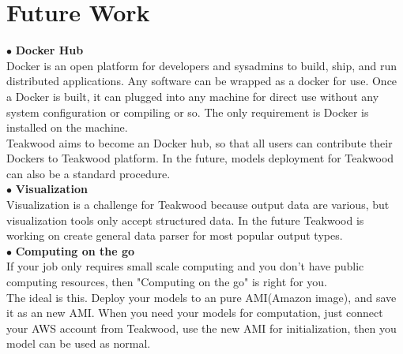 \chapter{Future Work}

$\bullet$ \textbf{Docker Hub}\\

Docker is an open platform for developers and sysadmins to build, ship, and run distributed applications. Any software can be wrapped as a docker for use. Once a Docker is built, it can plugged into any machine for direct use without any system configuration or compiling or so. The only requirement is Docker is installed on the machine.\\
Teakwood aims to become an Docker hub, so that all users can contribute their Dockers to Teakwood platform. In the future, models deployment for Teakwood can also be a standard procedure.\\

$\bullet$ \textbf{Visualization}\\

Visualization is a challenge for Teakwood because output data are various, but visualization tools only accept structured data. In the future Teakwood is working on create general data parser for most popular output types.\\

$\bullet$ \textbf{Computing on the go}\\

If your job only requires small scale computing and you don't have public computing resources, then "Computing on the go" is right for you.\\
The ideal is this. Deploy your models to an pure AMI(Amazon image), and save it as an new AMI. When you need your models for computation, just connect your AWS account from Teakwood, use the new AMI for initialization, then you model can be used as normal. 